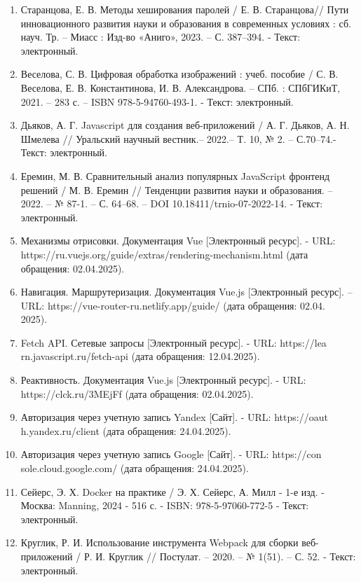 \documentclass[a4paper,14pt,oneside]{extreport}
\begin{document}
\begin{enumerate}
    \item Старанцова, Е. В. Методы хеширования паролей / Е. В. Старанцова// Пути инновационного развития науки и образования в современных условиях : сб. науч. Тр. – Миасс : Изд-во «Аниго», 2023. – С. 387–394. - Текст: электронный.
    \item Веселова, С. В. Цифровая обработка изображений : учеб. пособие / С. В. Веселова, Е. В. Константинова, И. В. Александрова. – СПб. : СПбГИКиТ, 2021. – 283 с. – ISBN 978-5-94760-493-1. - Текст: электронный.
    \newpage
    \item Дьяков, А. Г. Javascript для создания веб-приложений / А. Г. Дьяков, А. Н. Шмелева // Уральский научный вестник.– 2022.– Т. 10, № 2. – С.70–74.- Текст: электронный.
    \item Еремин, М. В. Сравнительный анализ популярных JavaScript фронтенд решений / М. В. Еремин // Тенденции развития науки и образования. – 2022. – № 87-1. – С. 64–68. – DOI 10.18411/trnio-07-2022-14. - Текст: электронный.
    \item Механизмы отрисовки. Документация Vue [Электронный ресурс]. - URL: https://ru.vuejs.org/guide/extras/rendering-mechanism.html (дата обращения: 02.04.2025).
    \item Навигация. Маршрутеризация. Документация Vue.js [Электронный ресурс]. – URL: https://vue-router-ru.netlify.app/guide/ (дата обращения: 02.04.\\2025).
    \item Fetch API. Сетевые запросы [Электронный ресурс]. - URL: https://lea\\rn.javascript.ru/fetch-api (дата обращения: 12.04.2025).
    \item Реактивность. Документация Vue.js [Электронный ресурс]. - URL: https://clck.ru/3MEjFf (дата обращения: 02.04.2025).
    \item Авторизация через учетную запись Yandex [Сайт]. - URL: https://oaut\\h.yandex.ru/client (дата обращения: 24.04.2025).
    \item Авторизация через учетную запись Google [Сайт]. - URL: https://con\\sole.cloud.google.com/ (дата обращения: 24.04.2025).
    \item  Сейерс, Э. Х. Docker на практике / Э. Х. Сейерс, А. Милл - 1-е изд. - Москва: Manning, 2024 - 516 с. - ISBN: 978-5-97060-772-5 - Текст: электронный.
    \item Круглик, Р. И. Использование инструмента Webpack для сборки веб-приложений / Р. И. Круглик // Постулат. – 2020. – № 1(51). – С. 52. - Текст: электронный.

\end{enumerate}
\end{document}
